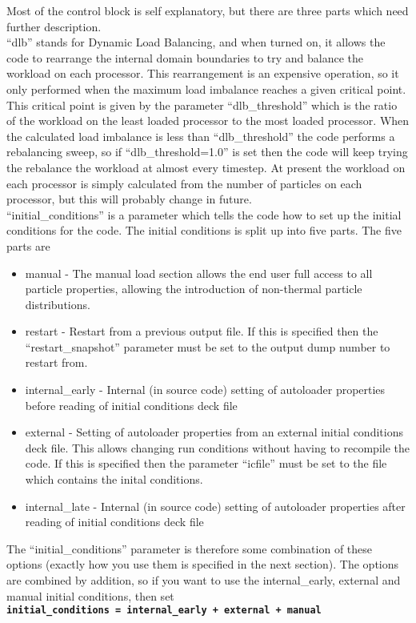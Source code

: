 \documentclass[12pt,a4paper]{article}
\newcommand{\inlinecode}[1]{{\color{warwickred} \bf\texttt{#1}}}
\newcommand{\EPOCH}{{\color{warwickdark}\fontfamily{phv}\selectfont{EPOCH}}}
\begin{document}
Most of the control block is self explanatory, but there are three parts which
need further description. \\
``dlb'' stands for Dynamic Load Balancing, and when turned on, it allows the
code to rearrange the internal domain boundaries to try and balance the
workload on each processor. This rearrangement is an expensive operation, so
it only performed when the maximum load imbalance reaches a given critical
point. This critical point is given by the parameter ``dlb\_threshold'' which
is the ratio of the workload on the least loaded processor to the most loaded
processor. When the calculated load imbalance is less than ``dlb\_threshold''
the code performs a rebalancing sweep, so if ``dlb\_threshold=1.0'' is set
then the code will keep trying the rebalance the workload at almost every
timestep. At present the workload on each processor is simply calculated from
the number of particles on each processor, but this will probably change in
future.\\
``initial\_conditions'' is a parameter which tells the code how to set up the
initial conditions for the code. The {\EPOCH} initial conditions is split up
into five parts. The five parts are
\begin{itemize}
\item manual - The manual load section allows the end user full access to all
  particle properties, allowing the introduction of non-thermal particle
  distributions.
\item restart - Restart from a previous output file. If this is specified then
  the ``restart\_snapshot'' parameter must be set to the output dump number to
  restart from.
\item internal\_early - Internal (in source code) setting of autoloader
  properties before reading of initial conditions deck file
\item external - Setting of autoloader properties from an external initial
  conditions deck file. This allows changing run conditions without having to
  recompile the code. If this is specified then the parameter ``icfile'' must
  be set to the file which contains the inital conditions.
\item internal\_late - Internal (in source code) setting of autoloader
  properties after reading of initial conditions deck file
\end{itemize}
The ``initial\_conditions'' parameter is therefore some combination of these
options (exactly how you use them is specified in the next section). The
options are combined by addition, so if you want to use the internal\_early,
external and manual initial conditions, then set\\
\inlinecode{initial\_conditions = internal\_early + external + manual}\\
\end{document}
